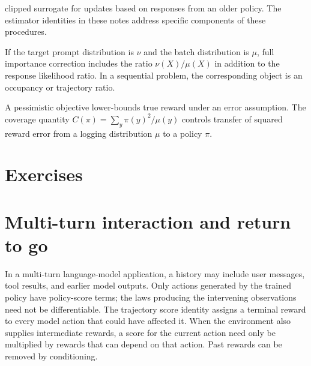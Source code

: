 \documentclass[11pt,twoside]{article}
\theoremstyle{definition}
\theoremstyle{remark}
\begin{document}
\begin{description}[style=nextline,leftmargin=1.5em,labelindent=0pt]
clipped surrogate for updates based on responses from an older policy.
The estimator identities in these notes address specific components of
these procedures.
\item[Context-distribution correction]
If the target prompt distribution is $\nu$ and the batch distribution is
$\mu$, full importance correction includes the ratio $\nu(X)/\mu(X)$ in
addition to the response likelihood ratio. In a sequential problem, the
corresponding object is an occupancy or trajectory ratio.
\item[Offline pessimism and coverage]
A pessimistic objective lower-bounds true reward under an error assumption.
The coverage quantity $C(\pi)=\sum_y\pi(y)^2/\mu(y)$ controls transfer of
squared reward error from a logging distribution $\mu$ to a policy $\pi$.
\end{description}

\section{Exercises}
\label{sec:exercises}
\exerciseinstructions
\setcounter{courseexercise}{0}














\appendix
\section{Multi-turn interaction and return to go}
\label{app:return}

In a multi-turn language-model application, a history may include user
messages, tool results, and earlier model outputs. Only actions generated by
the trained policy have policy-score terms; the laws producing the intervening
observations need not be differentiable. The trajectory score identity assigns
a terminal reward to every model action that could have affected it. When the
environment also supplies intermediate rewards, a score for the current action
need only be multiplied by rewards that can depend on that action. Past rewards
can be removed by conditioning.
\end{document}
